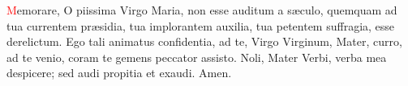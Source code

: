 \textcolor{red}{M}emorare, O piissima Virgo Maria, non esse auditum a s{\ae}culo, quemquam ad tua currentem pr{\ae}sidia, tua implorantem auxilia, 
tua petentem suffragia, esse derelictum. Ego tali animatus confidentia, ad te, Virgo Virginum, Mater, curro, ad te venio, coram te gemens 
peccator assisto. Noli, Mater Verbi, verba mea despicere; sed audi propitia et exaudi. Amen.